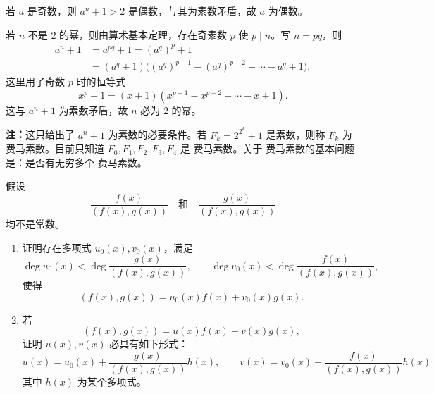 \begin{solution}

	
	若 \(a\) 是奇数，则 \(a^n+1>2\) 是偶数，与其为素数矛盾，故 \(a\) 为偶数。
	
	若 \(n\) 不是 \(2\) 的幂，则由算术基本定理，存在奇素数 \(p\) 使 \(p\mid n\)。写 \(n=pq\)，则
	\[
	\begin{aligned}
		a^n+1
		&=a^{pq}+1=(a^q)^p+1\\
		&=(a^q+1)\bigl((a^q)^{p-1}-(a^q)^{p-2}+\cdots-a^q+1\bigr),
	\end{aligned}
	\]
	这里用了奇数 \(p\) 时的恒等式
	\[
	x^p+1=(x+1)(x^{p-1}-x^{p-2}+\cdots-x+1).
	\]
	这与 \(a^n+1\) 为素数矛盾，故 \(n\) 必为 \(2\) 的幂。
	
	\textbf{注：}这只给出了 \(a^n+1\) 为素数的必要条件。若 \(F_k=2^{2^k}+1\) 是素数，则称 \(F_k\) 为 费马素数。目前只知道 \(F_0,F_1,F_2,F_3,F_4\) 是 费马素数。关于 费马素数的基本问题是：是否有无穷多个 费马素数。
\end{solution}

\begin{problem}
 假设
	\[
	\frac{f(x)}{(f(x),g(x))}
	\quad\text{和}\quad
	\frac{g(x)}{(f(x),g(x))}
	\]
	均不是常数。
	\begin{enumerate}
		\item 证明存在多项式 \(u_0(x),v_0(x)\)，满足
		\[
		\deg u_0(x)<\deg\frac{g(x)}{(f(x),g(x))},
		\qquad
		\deg v_0(x)<\deg\frac{f(x)}{(f(x),g(x))},
		\]
		使得
		\[
		(f(x),g(x))=u_0(x)f(x)+v_0(x)g(x).
		\]
		\item 若
		\[
		(f(x),g(x))=u(x)f(x)+v(x)g(x),
		\]
		证明 \(u(x),v(x)\) 必具有如下形式：
		\[
		u(x)=u_0(x)+\frac{g(x)}{(f(x),g(x))}h(x),
		\qquad
		v(x)=v_0(x)-\frac{f(x)}{(f(x),g(x))}h(x)
		\]
		其中 \(h(x)\) 为某个多项式。
	\end{enumerate}
\end{problem}

